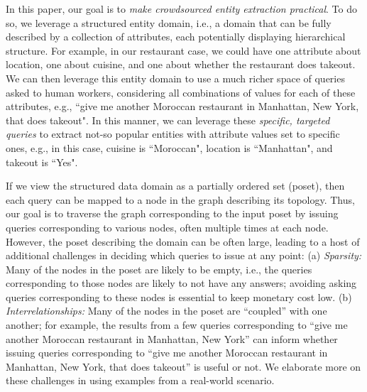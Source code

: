 In this paper, our goal is to {\em make crowdsourced entity extraction practical}. To do so, we leverage a structured entity domain, i.e., a domain that can be fully described by a collection of attributes, each potentially displaying hierarchical structure. For example, in our restaurant case, we could have one attribute about location, one about cuisine, and one about whether the restaurant does takeout. We can then leverage this entity domain to use a much richer space of queries asked to human workers, considering all combinations of values for each of these attributes, e.g., ``give me another Moroccan restaurant in Manhattan, New York, that does takeout".  In this manner, we can leverage these {\em specific, targeted queries} to extract not-so popular entities with attribute values set to specific ones, e.g., in this case, cuisine is ``Moroccan", location is ``Manhattan", and takeout is ``Yes".

If we view the structured data domain as a partially ordered set (poset), then each query can be mapped to a node in the graph describing its topology. Thus, our goal is to traverse the graph corresponding to the input poset by issuing queries corresponding to various nodes, often multiple times at each node. However, the poset describing the domain can be often large, leading to a host of additional challenges in deciding which queries to issue at any point: (a) {\em Sparsity:} Many of the nodes in the poset are likely to be empty, i.e., the queries corresponding to those nodes are likely to not have any answers; avoiding asking queries corresponding to these nodes is essential to keep monetary cost low. (b) {\em Interrelationships:} Many of the nodes in the poset are ``coupled'' with one another; for example, the results from a few queries corresponding to ``give me another Moroccan restaurant in Manhattan, New York'' can inform whether issuing queries corresponding to ``give me another Moroccan restaurant in Manhattan, New York, that does takeout'' is useful or not. We elaborate more on these challenges in  using examples from a real-world scenario.

